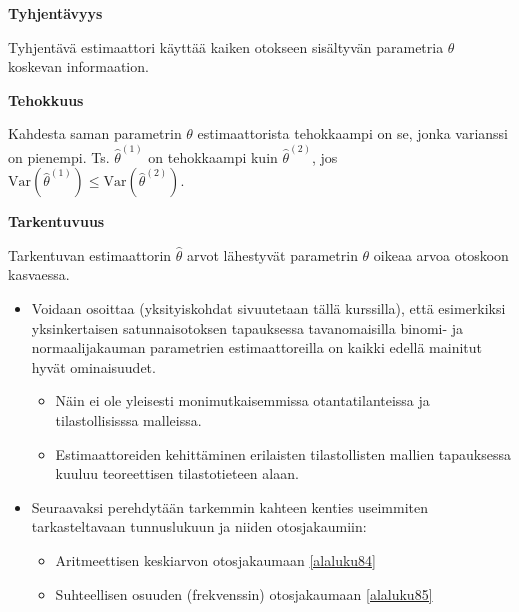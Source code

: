 \documentclass[
]{book}
\providecommand{\tightlist}{%
  \setlength{\itemsep}{0pt}\setlength{\parskip}{0pt}}
\begin{document}
\begin{defblock}{}
\textbf{Tyhjentävyys}

Tyhjentävä estimaattori käyttää kaiken otokseen sisältyvän parametria \(\theta\) koskevan informaation.

\end{defblock}

\begin{defblock}{}
\textbf{Tehokkuus}

Kahdesta saman parametrin \(\theta\) estimaattorista tehokkaampi on se, jonka varianssi on pienempi. Ts. \(\widehat{\theta}^{(1)}\) on tehokkaampi kuin \(\widehat{\theta}^{(2)}\), jos \(\mathrm{Var}(\widehat{\theta}^{(1)}) \le \mathrm{Var}(\widehat{\theta}^{(2)})\).

\end{defblock}

\begin{defblock}{}
\textbf{Tarkentuvuus}

Tarkentuvan estimaattorin \(\widehat{\theta}\) arvot lähestyvät parametrin \(\theta\) oikeaa arvoa otoskoon kasvaessa.

\end{defblock}

\begin{itemize}
\tightlist
\item
  Voidaan osoittaa (yksityiskohdat sivuutetaan tällä kurssilla), että esimerkiksi yksinkertaisen satunnaisotoksen tapauksessa tavanomaisilla binomi- ja normaalijakauman parametrien estimaattoreilla on kaikki edellä mainitut hyvät ominaisuudet.

  \begin{itemize}
  \tightlist
  \item
    Näin ei ole yleisesti monimutkaisemmissa otantatilanteissa ja tilastollisisssa malleissa.
  \item
    Estimaattoreiden kehittäminen erilaisten tilastollisten mallien tapauksessa kuuluu teoreettisen tilastotieteen alaan.
  \end{itemize}
\item
  Seuraavaksi perehdytään tarkemmin kahteen kenties useimmiten tarkasteltavaan tunnuslukuun ja niiden otosjakaumiin:

  \begin{itemize}
  \tightlist
  \item
    Aritmeettisen keskiarvon otosjakaumaan \ref{alaluku84}
  \item
    Suhteellisen osuuden (frekvenssin) otosjakaumaan \ref{alaluku85}
  \end{itemize}
\end{itemize}
\end{document}
